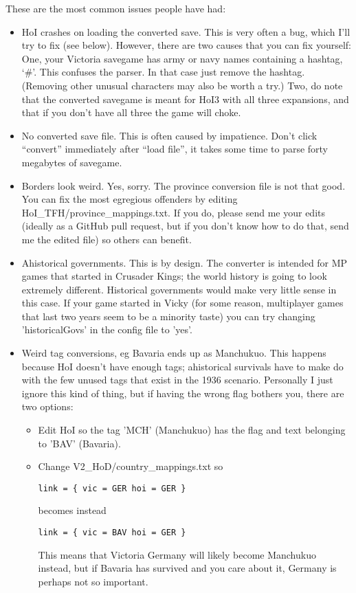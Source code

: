 \documentclass[12pt,ebook,oneside]{book}
\begin{document}
These are the most common issues people have had:
\begin{itemize}
\item HoI crashes on loading the converted save. This is very often a
  bug, which I'll try to fix (see below). However, there are two
  causes that you can fix yourself: One, your Victoria savegame
  has army or navy names containing a hashtag, `\#'. This confuses the
  parser. In that case just remove the hashtag. (Removing other
  unusual characters may also be worth a try.) Two, do note that the
  converted savegame is meant for HoI3 with all three expansions, and
  that if you don't have all three the game will choke.
\item No converted save file. This is often caused by
  impatience. Don't click ``convert'' immediately after ``load file'',
  it takes some time to parse forty megabytes of savegame.
\item Borders look weird. Yes, sorry. The province conversion file is
  not that good. You can fix the most egregious offenders by editing
  HoI\_TFH/province\_mappings.txt. If you do, please send me your
  edits (ideally as a GitHub pull request, but if you don't know how
  to do that, send me the edited file) so others can benefit.
\item Ahistorical governments. This is by design. The converter is
  intended for MP games that started in Crusader Kings; the world
  history is going to look extremely different. Historical governments
  would make very little sense in this case. If your game started in
  Vicky (for some reason, multiplayer games that last two years seem
  to be a minority taste) you can try changing 'historicalGovs' in the
  config file to 'yes'.
\item Weird tag conversions, eg Bavaria ends up as Manchukuo. This
  happens because HoI doesn't have enough tags; ahistorical survivals
  have to make do with the few unused tags that exist in the 1936
  scenario. Personally I just ignore this kind of thing, but if having
  the wrong flag bothers you, there are two options:
\begin{itemize}
\item Edit HoI so the tag 'MCH' (Manchukuo) has the flag and text
  belonging to 'BAV' (Bavaria).
\item Change V2\_HoD/country\_mappings.txt so
\begin{verbatim}
link = { vic = GER hoi = GER }
\end{verbatim}
becomes instead
\begin{verbatim}
link = { vic = BAV hoi = GER }
\end{verbatim}
This means that Victoria Germany will likely become Manchukuo instead,
but if Bavaria has survived and you care about it, Germany is perhaps
not so important.
\end{itemize}
\end{itemize}
\end{document}
